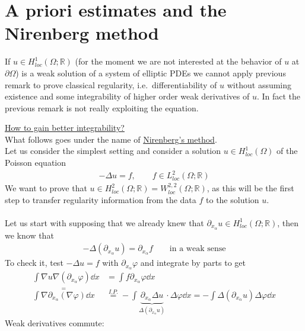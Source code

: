 \section{A priori estimates and the Nirenberg method}

If \( u \in  H_{loc}^{1} (\Omega; \mathbb{R})  \) (for the moment we are not interested at the behavior of \( u \) at \( \partial \Omega \)) is a weak solution of a system of elliptic PDEs we cannot apply previous remark to prove classical regularity, i.e.\ differentiability of \( u \) without assuming existence and some integrability of higher order weak derivatives of \( u \). In fact the previous remark is not really exploiting the equation.\\
\par
\underline{How to gain better integrability?}\\
What   follows goes under the name of \underline{Nirenberg's method}.\\
Let us consider the simplest setting and consider a solution \( u \in H_{loc}^{1} (\Omega)  \) of the Poisson equation
\begin{gather}
	- \Delta u = f, \qquad f \in L_{loc}^{2} (\Omega ;\mathbb{R})
\end{gather}
We want to prove that \( u \in H_{loc}^{2} (\Omega ; \mathbb{R}) =W_{loc}^{2,2} (\Omega ;\mathbb{R})  \), as this will be the first step to transfer regularity information from the data \( f \) to the solution \( u \).\\
\\
Let us start with supposing that we already knew that \( \partial_{x_{\alpha }} u \in H_{loc}^{1} (\Omega ;\mathbb{R})  \), then we know that
\begin{gather}
	-\Delta (\partial_{x_{\alpha }} u) = \partial_{x_{\alpha }} f \qquad \text{in a weak sense}
\end{gather}
To check it, test \( -\Delta u=f \) with \( \partial_{x_{\alpha }} \varphi  \) and integrate by parts to get
\begin{align}
	\int \nabla u \nabla (\partial_{x_{\alpha }}\varphi )  \dd{x}           & = \int f \partial_{x_{\alpha }}\varphi  \dd{x}  \\
	\overset{=}{\int \nabla \partial_{x_{\alpha }}(\nabla \varphi)  \dd{x}} & \overset{I.P.}{=} - \int \underbrace{\partial_{x_{\alpha }} \Delta u}_{\Delta (\partial_{x_{\alpha }} u) } \cdot \Delta \varphi \dd{x} = - \int \Delta (\partial_{x_{\alpha }}u) \Delta \varphi  \dd{x}
\end{align}
Weak derivatives commute:
